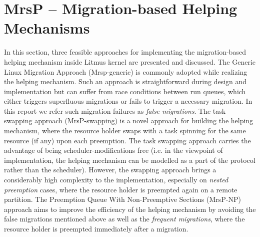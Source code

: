 \documentclass{report}
\begin{document}
\chapter{MrsP -- Migration-based Helping Mechanisms}
\label{Migration-based Helping Mechanism}
In this section, three feasible approaches for implementing the migration-based helping mechanism inside Litmus kernel are presented and discussed. The Generic Linux Migration Approach (Mrsp-generic) is commonly adopted while realizing the helping mechanism. Such an approach is straightforward during design and implementation but can suffer from race conditions between run queues, which either triggers superfluous migrations or fails to trigger a necessary migration. In this report we refer such migration failures as \emph{false migrations}. The task swapping approach (MrsP-swapping) is a novel approach for building the helping mechanism, where the resource holder swaps with a task spinning for the same resource (if any) upon each preemption. The task swapping approach carries the advantage of being scheduler-modifications free (i.e. in the viewpoint of implementation, the helping mechanism can be modelled as a part of the protocol rather than the scheduler). However, the swapping approach brings a considerably high complexity to the implementation, especially on \emph{nested preemption} cases, where the resource holder is preempted again on a remote partition. The Preemption Queue With Non-Preemptive Sections (MrsP-NP) approach aims to improve the efficiency of the helping mechanism by avoiding the false migrations mentioned above as well as the \emph{frequent migrations}, where the resource holder is preempted immediately after a migration.
\end{document}
